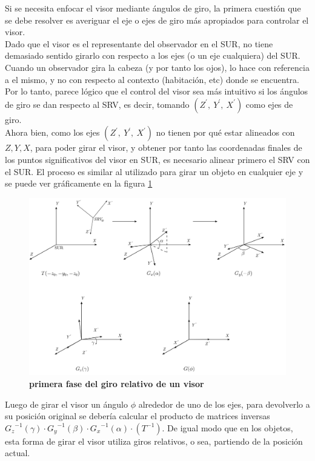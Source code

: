 Si se necesita enfocar el visor mediante ángulos de giro, la primera cuestión que se debe resolver es averiguar el eje o ejes de giro más apropiados para controlar el visor.\\
Dado que el visor es el representante del observador en el SUR, no tiene demasiado sentido girarlo con respecto a los ejes (o un eje cualquiera) del SUR. Cuando un observador gira la cabeza (y por tanto los ojos), lo hace con referencia a el mismo, y no con respecto al contexto (habitación, etc) donde se encuentra. Por lo tanto, parece lógico que el control del visor sea más intuitivo si los ángulos de giro se dan respecto al SRV, es decir, tomando $(Z^{\prime}, \ Y^{\prime}, \ X^{\prime})$ como ejes de giro.\\
Ahora bien, como los ejes $(Z^{\prime}, \ Y^{\prime}, \ X^{\prime})$ no tienen por qué estar alineados con $Z, Y, X$, para poder girar el visor, y obtener por tanto las coordenadas finales de los puntos significativos del visor en SUR, es necesario alinear primero el SRV con el SUR. El proceso es similar al utilizado para girar un objeto en cualquier eje y se puede ver gráficamente en la figura \ref{geo-visor6}

\begin{figure}[h]
\includegraphics[width=15cm]{Img/GEO/geo-visor-6.jpg}
\centering
    \caption{\footnotesize{\textbf{primera fase del giro relativo de un visor}}}
    \label{geo-visor6}
\end{figure}

Luego de girar el visor un ángulo $\phi$ alrededor de uno de los ejes, para devolverlo a su posición original se debería calcular el producto de matrices inversas\\
${{G_z}^{-1}}(\gamma) \cdot {{G_y}^{-1}}(\beta) \cdot {{G_x}^{-1}}(\alpha) \cdot (T^{-1})$. De igual modo que en los objetos, esta forma de girar el visor utiliza giros relativos, o sea, partiendo de la posición actual.\\

